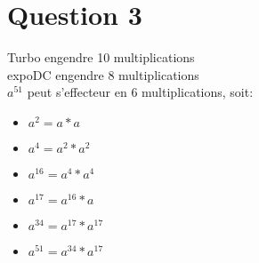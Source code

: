 \documentclass[10pt,letterpaper]{article}
\begin{document}
	\section*{Question 3}
	Turbo engendre 10 multiplications\\
	expoDC engendre 8 multiplications\\
	$a^51$ peut s'effecteur en 6 multiplications, soit:
	\begin{itemize}
		\item $a^2 = a * a$
		\item $a^4 = a^2 * a^2$
		\item $a^{16} = a^4 * a^4$
		\item $a^{17} = a^{16} * a$
		\item $a^{34} = a^{17} * a^{17}$
		\item $a^{51} = a^{34} * a^{17}$
	\end{itemize}
\end{document}
